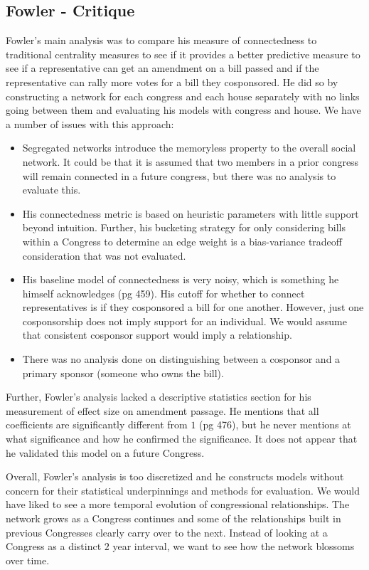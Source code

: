 \subsection{Fowler - Critique}

Fowler's main analysis was to compare his measure of connectedness to 
traditional centrality measures to see if it provides a better predictive 
measure to see if a representative can get an amendment on a bill passed and 
if the representative can rally more votes for a bill they cosponsored. He 
did so by constructing a network for each congress and each house separately 
with no links going between them and evaluating his models with congress and 
house. We have a number of issues with this approach:

\begin{itemize}
	\item Segregated networks introduce the memoryless property to the overall 
	social network. It could be that it is assumed that two members in a 
	prior congress will remain connected in a future congress, but there was no 
	analysis to evaluate this. 
	\item His connectedness metric is based on heuristic parameters with little 
	support beyond intuition. Further, his bucketing strategy for only 
	considering bills within a Congress to determine an edge weight is a 
	bias-variance tradeoff consideration that was not evaluated.
	\item His baseline model of connectedness is very noisy, which is something 
	he himself acknowledges (pg 459). His cutoff for whether to connect 
	representatives is if they cosponsored a bill for one another. However, 
	just one cosponsorship does not imply support for an individual. We would 
	assume that consistent cosponsor support would imply a relationship. 
	\item There was no analysis done on distinguishing between a cosponsor and 
	a primary sponsor (someone who owns the bill).
\end{itemize}

Further, Fowler's analysis lacked a descriptive statistics section for his 
measurement of effect size on amendment passage. He mentions that all 
coefficients are significantly different from $1$ (pg 476), but he never 
mentions at what significance and how he confirmed the significance. It does 
not appear that he validated this model on a future Congress.

Overall, Fowler's analysis is too discretized and he constructs models without 
concern for their statistical underpinnings and methods for evaluation. We 
would have liked to see a more temporal evolution of congressional 
relationships. The network grows as a Congress continues and some of the 
relationships built in previous Congresses clearly carry over to the next. 
Instead of looking at a Congress as a distinct $2$ year interval, we want to 
see how the network blossoms over time.
